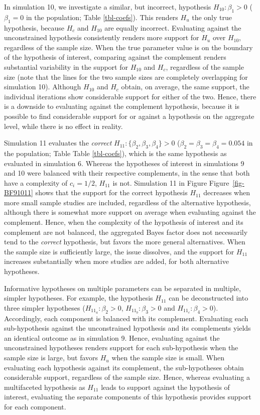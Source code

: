 \documentclass[
  authoryear,
  preprint,
  5p,
  twocolumn]{elsarticle}
\begin{document}
In simulation 10, we investigate a similar, but incorrect, hypothesis
\(H_{10}: \beta_1 > 0\) (\(\beta_{1}=0\) in the population; Table
\ref{tbl-coefs}). This renders \(H_u\) the only true hypothesis, because
\(H_c\) and \(H_{10}\) are equally incorrect. Evaluating against the
unconstrained hypothesis consistently renders more support for \(H_u\)
over \(H_{10}\), regardless of the sample size. When the true parameter
value is on the boundary of the hypothesis of interest, comparing
against the complement renders substantial variability in the support
for \(H_{10}\) and \(H_c\), regardless of the sample size (note that the
lines for the two sample sizes are completely overlapping for simulation
10). Although \(H_{10}\) and \(H_c\) obtain, on average, the same
support, the individual iterations show considerable support for either
of the two. Hence, there is a downside to evaluating against the
complement hypothesis, because it is possible to find considerable
support for or against a hypothesis on the aggregate level, while there
is no effect in reality.

Simulation 11 evaluates the \emph{correct}
\(H_{11}: \{\beta_2, \beta_3, \beta_4\} > 0\)
(\(\beta_2 = \beta_3 = \beta_4 = 0.054\) in the population; Table Table
\ref{tbl-coefs}), which is the same hypothesis as evaluated in
simulation 6. Whereas the hypotheses of interest in simulations 9 and 10
were balanced with their respective complements, in the sense that both
have a complexity of \(c_i = 1/2\), \(H_{11}\) is not. Simulation 11 in
Figure Figure~\ref{fig-BF91011} shows that the support for the correct
hypothesis \(H_{11}\) decreases when more small sample studies are
included, regardless of the alternative hypothesis, although there is
somewhat more support on average when evaluating against the complement.
Hence, when the complexity of the hypothesis of interest and its
complement are not balanced, the aggregated Bayes factor does not
necessarily tend to the \emph{correct} hypothesis, but favors the more
general alternatives. When the sample size is sufficiently large, the
issue dissolves, and the support for \(H_{11}\) increases substantially
when more studies are added, for both alternative hypotheses.

Informative hypotheses on multiple parameters can be separated in
multiple, simpler hypotheses. For example, the hypothesis \(H_{11}\) can
be deconstructed into three simpler hypotheses
(\(H_{11_a}: \beta_2 > 0\), \(H_{11_b}: \beta_3 > 0\) and
\(H_{11_c}: \beta_4 > 0\)). Accordingly, each component is balanced with
its complement. Evaluating each sub-hypothesis against the unconstrained
hypothesis and its complements yields an identical outcome as in
simulation 9. Hence, evaluating against the unconstrained hypotheses
renders support for each sub-hypothesis when the sample size is large,
but favors \(H_u\) when the sample size is small. When evaluating each
hypothesis against its complement, the sub-hypotheses obtain
considerable support, regardless of the sample size. Hence, whereas
evaluating a multifaceted hypothesis as \(H_{11}\) leads to support
against the hypothesis of interest, evaluating the separate components
of this hypothesis provides support for each component.
\end{document}
